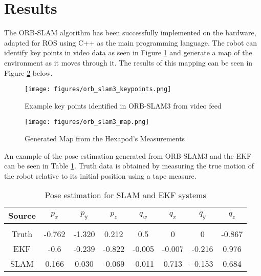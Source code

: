 
\section{ Results}
The ORB-SLAM algorithm has been successfully implemented on the hardware, adapted for ROS using C++ as the main programming language. The robot can identify key points in video data as seen in Figure \ref{fig:keypoints} and generate a map of the environment as it moves through it. The results of this mapping can be seen in Figure \ref{fig:map} below.


\begin{figure}[h]
    \centering
    \texttt{[image: figures/orb\_slam3\_keypoints.png]}
    \caption{Example key points identified in ORB-SLAM3 from video feed}
    \label{fig:keypoints}
\end{figure}

\begin{figure}[h]
    \centering
    \texttt{[image: figures/orb\_slam3\_map.png]}
    \caption{ Generated Map from the Hexapod's Measurements}
    \label{fig:map}
\end{figure}

An example of the pose estimation generated from ORB-SLAM3 and the EKF can be seen in Table \ref{table:pose_data}. Truth data is obtained by measuring the true motion of the robot relative to its initial position using a tape measure. 

\begin{table}[h!]
\begin{adjustbox}{width=0.5\textwidth}
\begin{tabularx}{0.6\textwidth}{ ||c c c c c c c c ||}

    \hline
    Source & $p_x$ & $p_y$ & $p_z$ & $q_w$ & $q_x$ & $q_y$ & $q_z$ \\
    \hline \\
    Truth & -0.762 & -1.320 & 0.212 & 0.5 & 0 & 0 & -0.867 \\
    EKF & -0.6 & -0.239 & -0.822 & -0.005 & -0.007 & -0.216 & 0.976 \\
    SLAM & 0.166 & 0.030 & -0.069 & -0.011 & 0.713 & -0.153 & 0.684 \\
    \hline

\end{tabularx}
\end{adjustbox}
\caption{Pose estimation for SLAM and EKF systems}
\label{table:pose_data}
\end{table}
